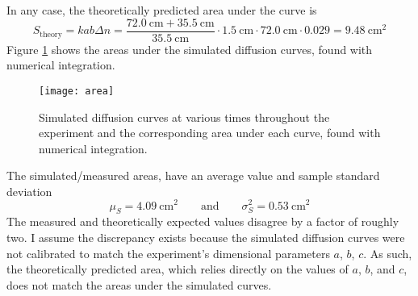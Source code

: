 \documentclass[11pt, a4paper]{article}
\newcommand{\eqtext}[1]{\qquad \text{#1} \qquad}
\begin{document}
\vspace{2mm}
In any case, the theoretically predicted area under the curve is
\begin{equation*}
	S_{\text{theory}} = k a b \Delta n = \frac{\SI{72.0}{\centi \meter} + \SI{35.5}{\centi \meter}}{\SI{35.5}{\centi \meter}} \cdot \SI{1.5}{\centi \meter} \cdot \SI{72.0}{\centi \meter} \cdot 0.029 = \boxed{\SI{9.48}{\centi \meter^{2}}}
\end{equation*}
Figure \ref{diftek:fig:area} shows the areas under the simulated diffusion curves, found with numerical integration. 
 
\begin{figure}[htb!]
\texttt{[image: area]}
\caption{Simulated diffusion curves at various times throughout the experiment and the corresponding area under each curve, found with numerical integration.}
\label{diftek:fig:area}
\end{figure}

The simulated/measured areas, have an average value and sample standard deviation
\begin{equation*}
	\mu_{S} = \SI{4.09}{\centi \meter^{2}} \eqtext{and} \sigma_{S}^{2} = \SI{0.53}{\centi \meter^{2}}
\end{equation*}
The measured and theoretically expected values disagree by a factor of roughly two. I assume the discrepancy exists because the simulated diffusion curves were not calibrated to match the experiment's dimensional parameters $ a $, $ b $, $ c $. As such, the theoretically predicted area, which relies directly on the values of $ a $, $ b $, and $ c $, does not match the areas under the simulated curves.
\end{document}
